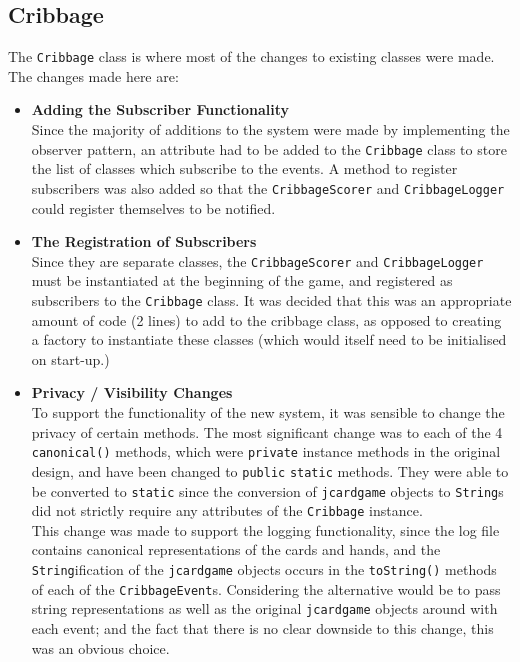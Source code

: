 \documentclass{article}
\begin{document}
\subsection{Cribbage}
The \verb|Cribbage| class is where most of the changes to existing classes were made. The changes made here are:
\begin{itemize}
    \item \textbf{Adding the Subscriber Functionality}\\[2mm]
    Since the majority of additions to the system were made by implementing the observer pattern, an attribute had to be added to the \verb|Cribbage| class to store the list of classes which subscribe to the events. A method to register subscribers was also added so that the \verb|CribbageScorer| and \verb|CribbageLogger| could register themselves to be notified.
    \item \textbf{The Registration of Subscribers}\\[2mm]
    Since they are separate classes, the \verb|CribbageScorer| and \verb|CribbageLogger| must be instantiated at the beginning of the game, and registered as subscribers to the \verb|Cribbage| class. It was decided that this was an appropriate amount of code (2 lines) to add to the cribbage class, as opposed to creating a factory to instantiate these classes (which would itself need to be initialised on start-up.)
    \item \textbf{Privacy / Visibility Changes}\\[2mm] 
    To support the functionality of the new system, it was sensible to change the privacy of certain methods. The most significant change was to each of the 4 \verb|canonical()| methods, which were \verb|private| instance methods in the original design, and have been changed to \verb|public| \verb|static| methods. They were able to be converted to \verb|static| since the conversion of \verb|jcardgame| objects to \verb|String|s did not strictly require any attributes of the \verb|Cribbage| instance.\\[2mm]
    This change was made to support the logging functionality, since the log file contains canonical representations of the cards and hands, and the \verb|String|ification of the \verb|jcardgame| objects occurs in the \verb|toString()| methods of each of the \verb|CribbageEvent|s. Considering the alternative would be to pass string representations as well as the original \verb|jcardgame| objects around with each event; and the fact that there is no clear downside to this change, this was an obvious choice.
\end{itemize}
\end{document}

